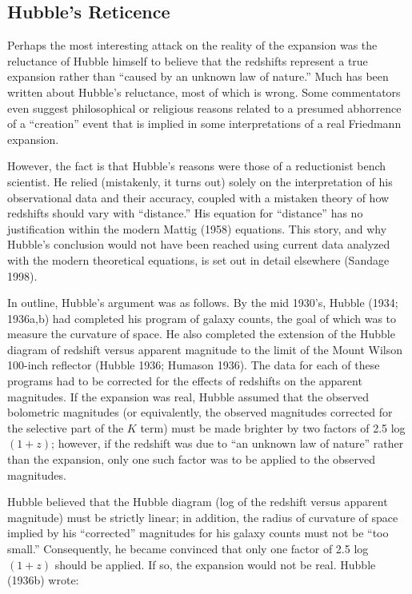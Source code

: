 \documentclass[preprint]{aastex}
\begin{document}
\subsection{Hubble's Reticence}

Perhaps the most interesting attack on the reality of the expansion
was the reluctance of Hubble himself to believe that the redshifts
represent a true expansion rather than ``caused by an unknown law of
nature.'' Much has been written about Hubble's reluctance, most of
which is wrong. Some commentators even suggest philosophical or
religious reasons related to a presumed abhorrence of a ``creation''
event that is implied in some interpretations of a real Friedmann
expansion.

However, the fact is that Hubble's reasons were those of a
reductionist bench scientist. He relied (mistakenly, it turns out)
solely on the interpretation of his observational data and their
accuracy, coupled with a mistaken theory of how redshifts should vary
with ``distance.''  His equation for ``distance'' has no justification
within the modern Mattig (1958) equations. This story, and why
Hubble's conclusion would not have been reached using current data
analyzed with the modern theoretical equations, is set out in detail
elsewhere (Sandage 1998).

In outline, Hubble's argument was as follows. By the mid 1930's,
Hubble (1934; 1936a,b) had completed his program of galaxy counts, the
goal of which was to measure the curvature of space.  He also
completed the extension of the Hubble diagram of redshift versus
apparent magnitude to the limit of the Mount Wilson 100-inch reflector
(Hubble 1936; Humason 1936).  The data for each of these programs had
to be corrected for the effects of redshifts on the apparent
magnitudes. If the expansion was real, Hubble assumed that the
observed bolometric magnitudes (or equivalently, the observed
magnitudes corrected for the selective part of the $K$ term) must be
made brighter by two factors of 2.5 log $(1 + z)$; however, if the
redshift was due to ``an unknown law of nature'' rather than the
expansion, only one such factor was to be applied to the observed
magnitudes.

Hubble believed that the Hubble diagram (log of the redshift versus
apparent magnitude) must be strictly linear; in addition, the radius
of curvature of space implied by his ``corrected'' magnitudes for his
galaxy counts must not be ``too small.''  Consequently, he became
convinced that only one factor of 2.5 log $(1 + z)$ should be
applied. If so, the expansion would not be real. Hubble (1936b) wrote:
\end{document}
